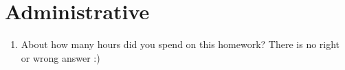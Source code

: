 \documentclass{article}
\begin{document}
\section*{Administrative}
\begin{aprob}
\begin{enumerate}
    \item {} About how many hours did you spend on this homework? There is no right or wrong answer :)
\end{enumerate}
\end{aprob}
\end{document}
